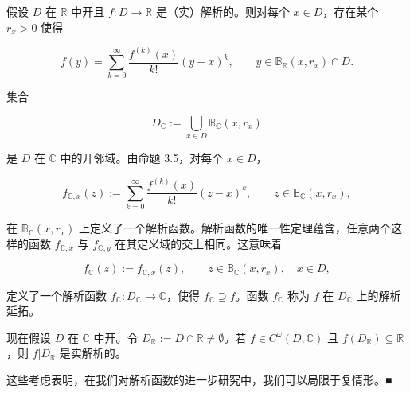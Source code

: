 \begin{remark}

假设 $D$ 在 $\mathbb{R}$ 中开且 $f: D \to \mathbb{R}$ 是（实）解析的。则对每个 $x \in D$，存在某个 $r_x > 0$ 使得

\[
f(y)=\sum_{k=0}^{\infty}\frac{f^{(k)}(x)}{k!}(y-x)^{k},\qquad y\in\mathbb{B}_{\mathbb{R}}(x,r_{x})\cap D.
\]

集合

\[
D_{\mathbb{C}}:=\bigcup_{x\in D}\mathbb{B}_{\mathbb{C}}(x,r_{x})
\]

是 $D$ 在 $\mathbb{C}$ 中的开邻域。由命题 3.5，对每个 $x \in D$，

\[
f_{\mathbb{C},x}(z):=\sum_{k=0}^{\infty}\frac{f^{(k)}(x)}{k!}(z-x)^{k},\qquad z\in\mathbb{B}_{\mathbb{C}}(x,r_{x}),
\]

在 $\mathbb{B}_{\mathbb{C}}(x,r_x)$ 上定义了一个解析函数。解析函数的唯一性定理蕴含，任意两个这样的函数 $f_{\mathbb{C},x}$ 与 $f_{\mathbb{C},y}$ 在其定义域的交上相同。这意味着

\[
f_{\mathbb{C}}(z):=f_{\mathbb{C},x}(z),\qquad z\in\mathbb{B}_{\mathbb{C}}(x,r_{x}),\quad x\in D,
\]

定义了一个解析函数 $ f_{\mathbb{C}}: D_{\mathbb{C}} \to \mathbb{C} $，使得 $ f_{\mathbb{C}} \supseteq f $。函数 $ f_{\mathbb{C}} $ 称为 $ f $ 在 $ D_{\mathbb{C}} $ 上的解析延拓。

现在假设 $D$ 在 $\mathbb{C}$ 中开。令 $D_{\mathbb{R}} := D \cap \mathbb{R} \neq \emptyset$。若 $f \in C^\omega(D, \mathbb{C})$ 且 $f(D_{\mathbb{R}}) \subseteq \mathbb{R}$，则 $f|D_{\mathbb{R}}$ 是实解析的。

这些考虑表明，在我们对解析函数的进一步研究中，我们可以局限于复情形。■

\end{remark}

\exerciseshead


